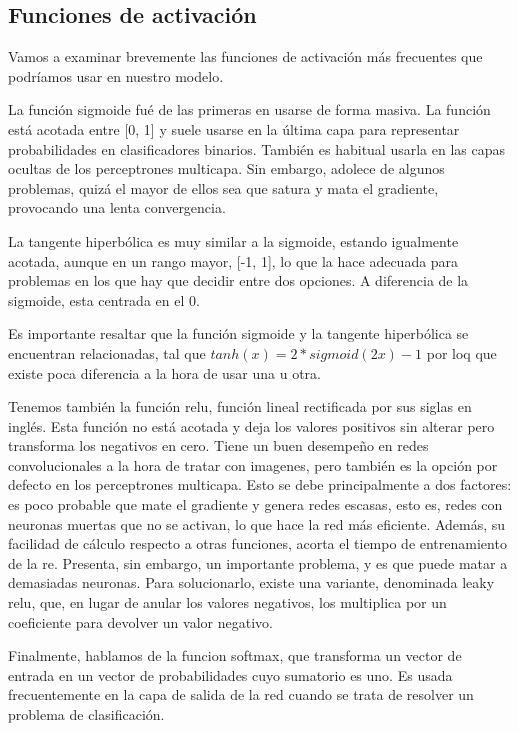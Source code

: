 \subsection{Funciones de activación}\label{funciones-de-activacion}

Vamos a examinar brevemente las funciones de activación más frecuentes
que podríamos usar en nuestro modelo.

La función sigmoide fué de las primeras en usarse de forma masiva. La
función está acotada entre {[}0, 1{]} y suele usarse en la última capa
para representar probabilidades en clasificadores binarios. También es
habitual usarla en las capas ocultas de los perceptrones multicapa. Sin
embargo, adolece de algunos problemas, quizá el mayor de ellos sea que
satura y mata el gradiente, provocando una lenta convergencia.

La tangente hiperbólica es muy similar a la sigmoide, estando igualmente
acotada, aunque en un rango mayor, {[}-1, 1{]}, lo que la hace adecuada
para problemas en los que hay que decidir entre dos opciones. A
diferencia de la sigmoide, esta centrada en el 0.

Es importante resaltar que la función sigmoide y la tangente hiperbólica
se encuentran relacionadas, tal que \(tanh(x) = 2 * sigmoid(2x) -1\) por
loq que existe poca diferencia a la hora de usar una u otra.

Tenemos también la función relu, función lineal rectificada por sus
siglas en inglés. Esta función no está acotada y deja los valores
positivos sin alterar pero transforma los negativos en cero. Tiene un
buen desempeño en redes convolucionales a la hora de tratar con
imagenes, pero también es la opción por defecto en los perceptrones
multicapa. Esto se debe principalmente a dos factores: es poco probable
que mate el gradiente y genera redes escasas, esto es, redes con
neuronas muertas que no se activan, lo que hace la red más eficiente.
Además, su facilidad de cálculo respecto a otras funciones, acorta el
tiempo de entrenamiento de la re. Presenta, sin embargo, un importante
problema, y es que puede matar a demasiadas neuronas. Para solucionarlo,
existe una variante, denominada leaky relu, que, en lugar de anular los
valores negativos, los multiplica por un coeficiente para devolver un
valor negativo.

Finalmente, hablamos de la funcion softmax, que transforma un vector de
entrada en un vector de probabilidades cuyo sumatorio es uno. Es usada
frecuentemente en la capa de salida de la red cuando se trata de
resolver un problema de clasificación.

